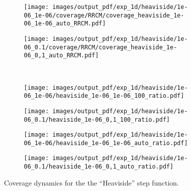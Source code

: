 \documentclass[a4paper,14pt]{extarticle}
\begin{document}
\begin{figure}
\begin{subfigure}[b]{0.25\linewidth}
  \end{subfigure}%
  \begin{subfigure}[b]{0.25\linewidth}
    \texttt{[image: images/output\_pdf/exp\_1d/heaviside/1e-06\_1e-06/coverage/RRCM/coverage\_heaviside\_1e-06\_1e-06\_auto\_RRCM.pdf]}
  \end{subfigure}%
  \begin{subfigure}[b]{0.25\linewidth}
    \texttt{[image: images/output\_pdf/exp\_1d/heaviside/1e-06\_0.1/coverage/RRCM/coverage\_heaviside\_1e-06\_0,1\_auto\_RRCM.pdf]}
  \end{subfigure}\\
  \begin{subfigure}[b]{0.25\linewidth}
    \texttt{[image: images/output\_pdf/exp\_1d/heaviside/1e-06\_1e-06/heaviside\_1e-06\_1e-06\_100\_ratio.pdf]}
    \caption{} \label{fig:heaviside_1d_low_noise_c1}
  \end{subfigure}%
  \begin{subfigure}[b]{0.25\linewidth}
    \texttt{[image: images/output\_pdf/exp\_1d/heaviside/1e-06\_0.1/heaviside\_1e-06\_0,1\_100\_ratio.pdf]}
    \caption{} \label{fig:heaviside_1d_low_noise_c2}
  \end{subfigure}%
  \begin{subfigure}[b]{0.25\linewidth}
    \texttt{[image: images/output\_pdf/exp\_1d/heaviside/1e-06\_1e-06/heaviside\_1e-06\_1e-06\_auto\_ratio.pdf]}
    \caption{} \label{fig:heaviside_1d_low_noise_c3}
  \end{subfigure}%
  \begin{subfigure}[b]{0.25\linewidth}
    \texttt{[image: images/output\_pdf/exp\_1d/heaviside/1e-06\_0.1/heaviside\_1e-06\_0,1\_auto\_ratio.pdf]}
    \caption{} \label{fig:heaviside_1d_low_noise_c4}
  \end{subfigure}%
  \caption{Coverage dynamics for the the ``Heaviside'' step function.}
  \label{fig:heaviside_1d_low_noise}
\end{figure}
\end{document}
